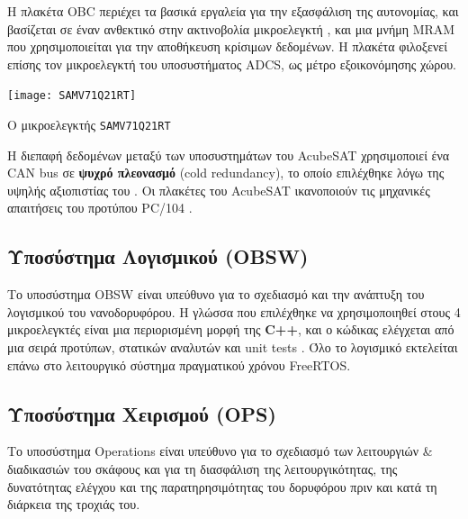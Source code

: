 \documentclass[a4paper,nobib]{tufte-book}
\begin{document}
Η πλακέτα \ac{OBC} περιέχει τα βασικά εργαλεία για την εξασφάλιση της αυτονομίας, και βασίζεται σε έναν ανθεκτικό στην ακτινοβολία μικροελεγκτή , και μια μνήμη \acs{MRAM} που χρησιμοποιείται για την αποθήκευση κρίσιμων δεδομένων. Η πλακέτα φιλοξενεί επίσης τον μικροελεγκτή του υποσυστήματος \ac{ADCS}, ως μέτρο εξοικονόμησης χώρου.

\begin{marginfigure}
	\centering
	\texttt{[image: SAMV71Q21RT]}
	\caption{Ο μικροελεγκτής \texttt{SAMV71Q21RT}}
	\label{fig:samv71}
\end{marginfigure}

Η διεπαφή δεδομένων μεταξύ των υποσυστημάτων του AcubeSAT χρησιμοποιεί ένα \ac{CAN} bus σε \textbf{ψυχρό πλεονασμό} (cold redundancy), το οποίο επιλέχθηκε λόγω της υψηλής αξιοπιστίας του \autocite{bouwmeester_survey_implementation_2017}. Οι πλακέτες του AcubeSAT ικανοποιούν τις μηχανικές απαιτήσεις του προτύπου PC/104 \autocite{PC104}.

\subsection{Υποσύστημα Λογισμικού (\acs{OBSW})}


Το υποσύστημα \ac{OBSW} είναι υπεύθυνο για το σχεδιασμό και την ανάπτυξη του λογισμικού του νανοδορυφόρου. Η γλώσσα που επιλέχθηκε να χρησιμοποιηθεί στους 4 μικροελεγκτές είναι μια περιορισμένη μορφή της \textbf{C++}, και ο κώδικας ελέγχεται από μια σειρά προτύπων, στατικών αναλυτών και unit tests \autocite{DDJF_OBSW}. Όλο το λογισμικό εκτελείται επάνω στο λειτουργικό σύστημα πραγματικού χρόνου Free\acs{RTOS}.


\subsection{Υποσύστημα Χειρισμού (\acs{OPS})}

Το υποσύστημα Operations είναι υπεύθυνο για το σχεδιασμό των λειτουργιών \& διαδικασιών του σκάφους και για τη διασφάλιση της λειτουργικότητας, της δυνατότητας ελέγχου και της παρατηρησιμότητας του δορυφόρου πριν και κατά τη διάρκεια της τροχιάς του.
\end{document}
